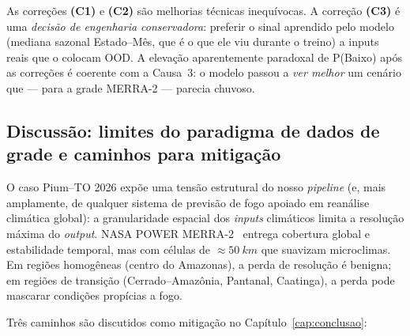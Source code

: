 As correções \textbf{(C1)} e \textbf{(C2)} são melhorias técnicas inequívocas. A correção \textbf{(C3)} é uma \emph{decisão de engenharia conservadora}: preferir o sinal aprendido pelo modelo (mediana sazonal Estado--Mês, que é o que ele viu durante o treino) a inputs reais que o colocam OOD. A elevação aparentemente paradoxal de P(Baixo) após as correções é coerente com a Causa~3: o modelo passou a \emph{ver melhor} um cenário que --- para a grade MERRA-2 --- parecia chuvoso.

\subsection{Discussão: limites do paradigma de dados de grade e caminhos para mitigação}
\label{subsec:pium_discussao}

O caso Pium--TO 2026 expõe uma tensão estrutural do nosso \emph{pipeline} (e, mais amplamente, de qualquer sistema de previsão de fogo apoiado em reanálise climática global): a granularidade espacial dos \emph{inputs} climáticos limita a resolução máxima do \emph{output}. NASA POWER MERRA-2~\cite{nasapower} entrega cobertura global e estabilidade temporal, mas com células de $\approx \SI{50}{km}$ que suavizam microclimas. Em regiões homogêneas (centro do Amazonas), a perda de resolução é benigna; em regiões de transição (Cerrado--Amazônia, Pantanal, Caatinga), a perda pode mascarar condições propícias a fogo.

Três caminhos são discutidos como mitigação no Capítulo~\ref{cap:conclusao}:

